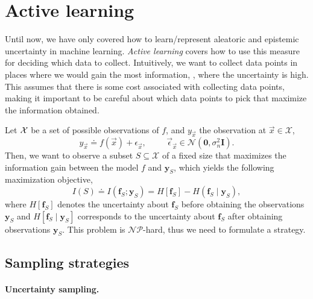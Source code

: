 \section{Active learning} \label{sec:active_learning}

Until now, we have only covered how to learn/represent aleatoric and epistemic
uncertainty in machine learning. \textit{Active learning} covers how to use
this measure for deciding which data to collect. Intuitively, we want to
collect data points in places where we would gain the most information, \ie,
where the uncertainty is high. This assumes that there is some cost associated
with collecting data points, making it important to be careful about which data
points to pick that maximize the information obtained.

Let $\mathcal{X}$ be a set of possible observations of $f$, and $y_{\vec{x}}$
the observation at $\vec{x}\in\mathcal{X}$, \[
    y_{\vec{x}} \doteq f(\vec{x}) + \epsilon_{\vec{x}}, \hspace{1cm} \vec{\epsilon}_{\vec{x}} \in \mathcal{N}(\bm{0},\sigma_n^2 \bm{I}).
\]
Then, we want to observe a subset $S\subseteq\mathcal{X}$ of a fixed size
that maximizes the information gain between the model $f$ and $\bm{y}_S$,
which yields the following maximization objective, \[
    I(S) \doteq I(\bm{f}_S;\bm{y}_S) = H[\bm{f}_S] - H(\bm{f}_S\mid\bm{y}_S),
\]
where $H[\bm{f}_S]$ denotes the uncertainty about $\bm{f}_S$ before obtaining
the observations $\bm{y}_S$ and $H[\bm{f}_S\mid\bm{y}_S]$ corresponds to the
uncertainty about $\bm{f}_S$ after obtaining observations $\bm{y}_S$. This
problem is $\mathcal{NP}$-hard, thus we need to formulate a strategy.

\subsection{Sampling strategies}

\paragraph{Uncertainty sampling.}


